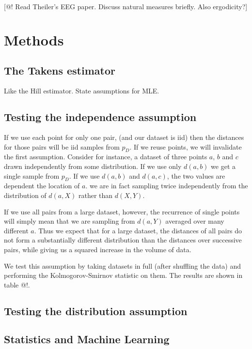 \documentclass[11pt]{article}
\begin{document}
[@! Read Theiler's EEG paper. Discuss natural measures briefly. Also ergodicity?]

\section{Methods}

\subsection{The Takens estimator}

Like the Hill estimator. State assumptions for MLE. 

\subsection{Testing the independence assumption}

If we use each point for only one pair, (and our dataset is iid) then the distances for those pairs will be iid samples from $p_D$. If we reuse points, we will invalidate the first assumption. Consider for instance, a dataset of three points $a$, $b$ and $c$ drawn independently from some distribution. If we use only $d(a, b)$ we get a single sample from $p_D$. If we use $d(a, b)$ and $d(a, c)$, the two values are dependent the location of $a$. we are in fact sampling twice independently from the distribution of $d(a, X)$ rather than $d(X, Y)$.
 
If we use all pairs from a large dataset, however, the recurrence of single points will simply mean that we are sampling from $d(a, Y)$ averaged over many different $a$. Thus we expect that for a large dataset, the distances of all pairs do not form a substantially different distribution than the distances over successive pairs, while giving us a squared increase in the volume of data.

We test this assumption by taking datasets in full (after shuffling the data) and performing the Kolmogorov-Smirnov statistic on them. The results are shown in table @!.

\subsection{Testing the distribution assumption}



\subsection{Statistics and Machine Learning}
\end{document}
